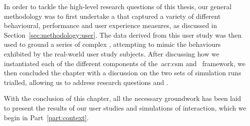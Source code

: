 In order to tackle the high-level research questions of this thesis, our general methodology was to first undertake a  that captured a variety of different behavioural, performance and user experience measures, as discussed in Section~\ref{sec:methodology:user}. The data derived from this user study was then used to ground a series of complex , attempting to mimic the behaviours exhibited by the real-world user study subjects. After discussing how we instantiated each of the different components of the~\gls{acr:csm} and \simiir~framework, we then concluded the chapter with a discussion on the two sets of simulation runs trialled, allowing us to address research questions  and .

With the conclusion of this chapter, all the necessary groundwork has been laid to present the results of our user studies and simulations of interaction, which we begin in Part~\ref{part:context}.